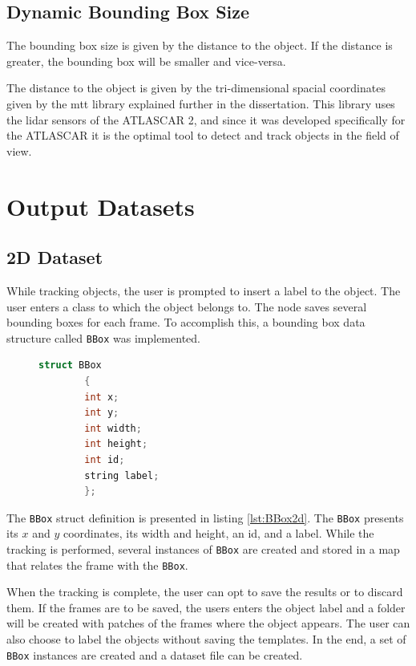 \subsection{Dynamic Bounding Box Size}
The bounding box size is given by the distance to the object. If the distance is greater, the bounding box will be smaller and vice-versa.

The distance to the object is given by the tri-dimensional spacial coordinates given by the \gls{mtt} library explained further in the dissertation. This library uses the \gls{lidar} sensors of the ATLASCAR 2, and since it was developed specifically for the ATLASCAR it is the optimal tool to detect and track objects in the field of view.

\section{Output Datasets}

\subsection{2D Dataset}

While tracking objects, the user is prompted to insert a label to the object. The user enters a class to which the object belongs to. The node saves several bounding boxes for each frame. To accomplish this, a bounding box data structure called \texttt{BBox} was implemented.

\begin{figure}
	\begin{center}
		\begin{lstlisting}[label={lst:BBox2d}, caption={BBox struct definition used for 2D datasets.},language=c++]
		struct BBox
		{
		int x;
		int y;
		int width;
		int height;
		int id;
		string label;
		};\end{lstlisting}
	\end{center}
\end{figure}

The \texttt{BBox} struct definition is presented in listing \ref{lst:BBox2d}. The \texttt{BBox} presents its $x$ and $y$ coordinates, its width and height, an id, and a label. While the tracking is performed, several instances of \texttt{BBox} are created and stored in a map that relates the frame with the \texttt{BBox}. 

When the tracking is complete, the user can opt to save the results or to discard them. If the frames are to be saved, the users enters the object label and a folder will be created with patches of the frames where the object appears. The user can also choose to label the objects without saving the templates. In the end, a set of \texttt{BBox} instances are created and a dataset file can be created.

